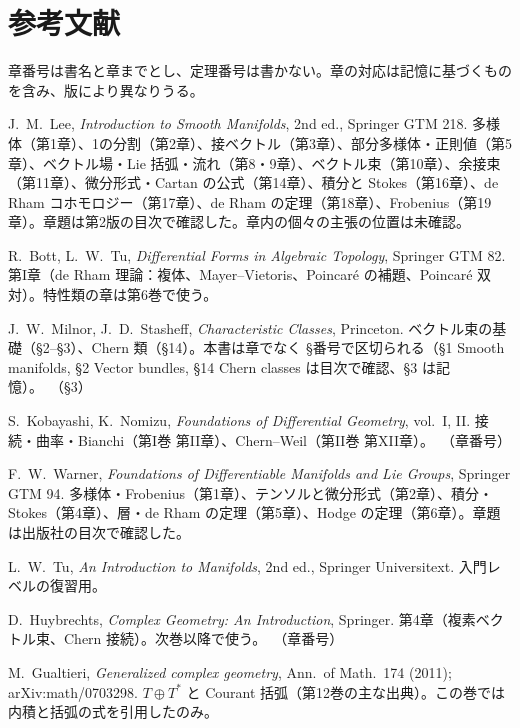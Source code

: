 \section*{参考文献}
章番号は書名と章までとし、定理番号は書かない。章の対応は記憶に基づくものを含み、版により異なりうる\tQ。
\begin{enumerate}[label={[\arabic*]},leftmargin=2.4em]
\item J.~M.~Lee, \emph{Introduction to Smooth Manifolds}, 2nd ed., Springer GTM 218. 多様体（第1章）、1の分割（第2章）、接ベクトル（第3章）、部分多様体・正則値（第5章）、ベクトル場・Lie 括弧・流れ（第8・9章）、ベクトル束（第10章）、余接束（第11章）、微分形式・Cartan の公式（第14章）、積分と Stokes（第16章）、de Rham コホモロジー（第17章）、de Rham の定理（第18章）、Frobenius（第19章）。章題は第2版の目次で確認した\tC。章内の個々の主張の位置は未確認。
\item R.~Bott, L.~W.~Tu, \emph{Differential Forms in Algebraic Topology}, Springer GTM 82. 第I章（de Rham 理論：複体、Mayer--Vietoris、Poincar\'e の補題、Poincar\'e 双対）。特性類の章は第6巻で使う。
\item J.~W.~Milnor, J.~D.~Stasheff, \emph{Characteristic Classes}, Princeton. ベクトル束の基礎（§2--§3）、Chern 類（§14）。本書は章でなく §番号で区切られる（§1 Smooth manifolds, §2 Vector bundles, §14 Chern classes は目次で確認、§3 は記憶）。\tQ\ （§3）
\item S.~Kobayashi, K.~Nomizu, \emph{Foundations of Differential Geometry}, vol.~I, II. 接続・曲率・Bianchi（第I巻 第II章）、Chern--Weil（第II巻 第XII章）。\tQ\ （章番号）
\item F.~W.~Warner, \emph{Foundations of Differentiable Manifolds and Lie Groups}, Springer GTM 94. 多様体・Frobenius（第1章）、テンソルと微分形式（第2章）、積分・Stokes（第4章）、層・de Rham の定理（第5章）、Hodge の定理（第6章）。章題は出版社の目次で確認した\tC。
\item L.~W.~Tu, \emph{An Introduction to Manifolds}, 2nd ed., Springer Universitext. 入門レベルの復習用。
\item D.~Huybrechts, \emph{Complex Geometry: An Introduction}, Springer. 第4章（複素ベクトル束、Chern 接続）。次巻以降で使う。\tQ\ （章番号）
\item M.~Gualtieri, \emph{Generalized complex geometry}, Ann.~of Math.~174 (2011); arXiv:math/0703298. $T\oplus T^*$ と Courant 括弧（第12巻の主な出典）。この巻では内積と括弧の式を引用したのみ。
\end{enumerate}

